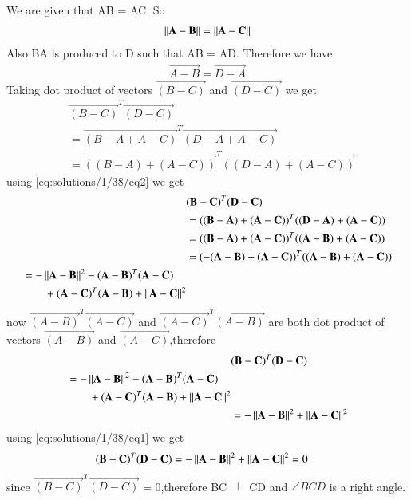 \begin{figure}[!h]
\centering
\resizebox{\columnwidth}{!}{}
\caption{}
\label{eq:solutions/1/38/myfig}
\end{figure}
We are given that AB = AC. So
\begin{align}
  \left\lVert\mathbf{A-B}\right\rVert = \left\lVert\mathbf{A-C}\right\rVert \label{eq:solutions/1/38/eq1}
\end{align}
Also BA is produced to D such that AB = AD. Therefore we have
\begin{align}
  \vec{A-B} = \vec{D-A} \label{eq:solutions/1/38/eq2}
\end{align}
Taking dot product of vectors $\vec{(B-C)}$ and $\vec{(D-C)}$ we get
\begin{align*}
  &\vec{(B-C)}^T\vec{(D-C)}\\
  &= \vec{(B-A+A-C)}^T\vec{(D-A+A-C)}\\
  &= \vec{((B-A)+(A-C))}^T\vec{((D-A)+(A-C))}
\end{align*}
using \eqref{eq:solutions/1/38/eq2} we get
\begin{align*}
  &\mathbf{(B-C)}^T\mathbf{(D-C)} \\
  &= \mathbf{((B-A)+(A-C))}^T\mathbf{((D-A)+(A-C))}\\
  &= \mathbf{((B-A)+(A-C))}^T\mathbf{((A-B)+(A-C))}\\
  &= \mathbf{(-(A-B)+(A-C))}^T\mathbf{((A-B)+(A-C))}\\
  \begin{split}
    &= -\left\lVert\mathbf{A-B}\right\rVert^2-\mathbf{(A-B)}^T\mathbf{(A-C)}\\
    &\qquad +\mathbf{(A-C)}^T\mathbf{(A-B)}+\left\lVert\mathbf{A-C}\right\rVert^2
  \end{split}
\end{align*}
now $\vec{(A-B)}^T\vec{(A-C)}$ and $\vec{(A-C)}^T\vec{(A-B)}$ are both dot product of vectors $\vec{(A-B)}$ and $\vec{(A-C)}$,therefore
\begin{align*}
  &\mathbf{(B-C)}^T\mathbf{(D-C)}\\
  \begin{split}
    &= -\left\lVert\mathbf{A-B}\right\rVert^2-\mathbf{(A-B)}^T\mathbf{(A-C)}\\
                                &\qquad +\mathbf{(A-C)}^T\mathbf{(A-B)}+\left\lVert\mathbf{A-C}\right\rVert^2
  \end{split}\\
  &= -\left\lVert\mathbf{A-B}\right\rVert^2+\left\lVert\mathbf{A-C}\right\rVert^2
\end{align*}
using \eqref{eq:solutions/1/38/eq1} we get
\begin{align}
  \mathbf{(B-C)}^T\mathbf{(D-C)} &= -\left\lVert\mathbf{A-B}\right\rVert^2+\left\lVert\mathbf{A-C}\right\rVert^2 = 0
\end{align}
since $\vec{(B-C)}^T\vec{(D-C)}$ = 0,therefore BC $\perp$ CD and $\angle{BCD}$ is a right angle.
